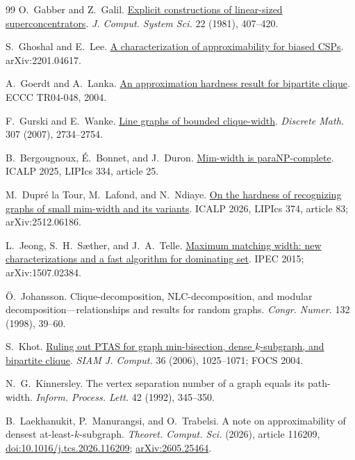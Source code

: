 \documentclass[11pt,letterpaper]{article}
\theoremstyle{definition}
\theoremstyle{remark}
\begin{document}
\begin{thebibliography}{99}
O.~Gabber and Z.~Galil.
\href{https://doi.org/10.1016/0022-0000(81)90040-4}{Explicit constructions of linear-sized superconcentrators}.
\emph{J. Comput. System Sci.} 22 (1981), 407--420.

S.~Ghoshal and E.~Lee.
\href{https://arxiv.org/abs/2201.04617}{A characterization of approximability for biased CSPs}.
arXiv:2201.04617.

A.~Goerdt and A.~Lanka.
\href{https://eccc.weizmann.ac.il/report/2004/048/}{An approximation hardness result for bipartite clique}.
ECCC TR04-048, 2004.

F.~Gurski and E.~Wanke.
\href{https://www.sciencedirect.com/science/article/pii/S0012365X07000684}{Line graphs of bounded clique-width}.
\emph{Discrete Math.} 307 (2007), 2734--2754.

B.~Bergougnoux, \'E.~Bonnet, and J.~Duron.
\href{https://doi.org/10.4230/LIPIcs.ICALP.2025.25}{Mim-width is paraNP-complete}.
ICALP 2025, LIPIcs 334, article 25.

M.~Dupr\'e la Tour, M.~Lafond, and N.~Ndiaye.
\href{https://doi.org/10.4230/LIPIcs.ICALP.2026.83}{On the hardness of recognizing graphs of small mim-width and its variants}.
ICALP 2026, LIPIcs 374, article 83; arXiv:2512.06186.

L.~Jeong, S.~H.~S\ae{}ther, and J.~A.~Telle.
\href{https://drops.dagstuhl.de/entities/document/10.4230/LIPIcs.IPEC.2015.212}{Maximum matching width: new characterizations and a fast algorithm for dominating set}.
IPEC 2015; arXiv:1507.02384.

\"O.~Johansson.
Clique-decomposition, NLC-decomposition, and modular decomposition---relationships and results for random graphs.
\emph{Congr. Numer.} 132 (1998), 39--60.

S.~Khot.
\href{https://doi.org/10.1137/S0097539705447037}{Ruling out PTAS for graph min-bisection, dense \(k\)-subgraph, and bipartite clique}.
\emph{SIAM J. Comput.} 36 (2006), 1025--1071; FOCS 2004.

N.~G.~Kinnersley.
The vertex separation number of a graph equals its path-width.
\emph{Inform. Process. Lett.} 42 (1992), 345--350.

B.~Laekhanukit, P.~Manurangsi, and O.~Trabelsi.
A note on approximability of densest at-least-\(k\)-subgraph.
\emph{Theoret. Comput. Sci.} (2026), article 116209,
\href{https://doi.org/10.1016/j.tcs.2026.116209}{doi:10.1016/j.tcs.2026.116209};
\href{https://arxiv.org/abs/2605.25464}{arXiv:2605.25464}.


\end{thebibliography}
\end{document}
